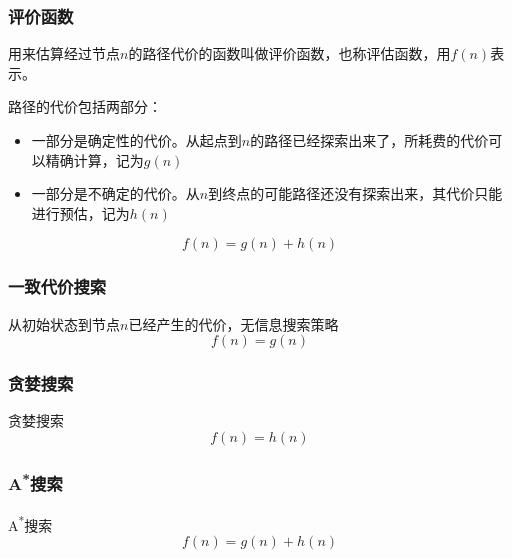 \subsubsection{评价函数}
\begin{definition}[评价函数]
    用来\textcolor{main1}{估算}经过节点$n$的路径代价的函数叫做\textcolor{main1}{评价函数}，也称\textcolor{main1}{评估函数}，用$f(n)$表示。
\end{definition}
\begin{note}
    路径的代价包括两部分：
    \begin{itemize}
        \item 一部分是确定性的代价。从起点到$n$的路径已经探索出来了，所耗费的代价可以精确计算，记为$g(n)$
        \item 一部分是不确定的代价。从$n$到终点的可能路径还没有探索出来，其代价只能进行预估，记为$h(n)$
    \end{itemize}
    \[
        f(n) = g(n) + h(n)
    \]
\end{note}
\subsubsection{一致代价搜索}
\begin{definition}[一致代价搜索]
    从初始状态到节点$n$已经产生的代价，\textcolor{main1}{无信息搜索策略}
    \[
        f(n) = g(n)
    \]
\end{definition}


\subsubsection{贪婪搜索}
\begin{definition}[贪婪搜索]
    贪婪搜索
    \[
        f(n) = h(n)
    \]
\end{definition}


\subsubsection{A\texorpdfstring{\textsuperscript{*}}{*}搜索}
\begin{definition}[A\textsuperscript{*}搜索]
    A\textsuperscript{*}搜索
    \[
        f(n) = g(n) + h(n)
    \]
\end{definition}

